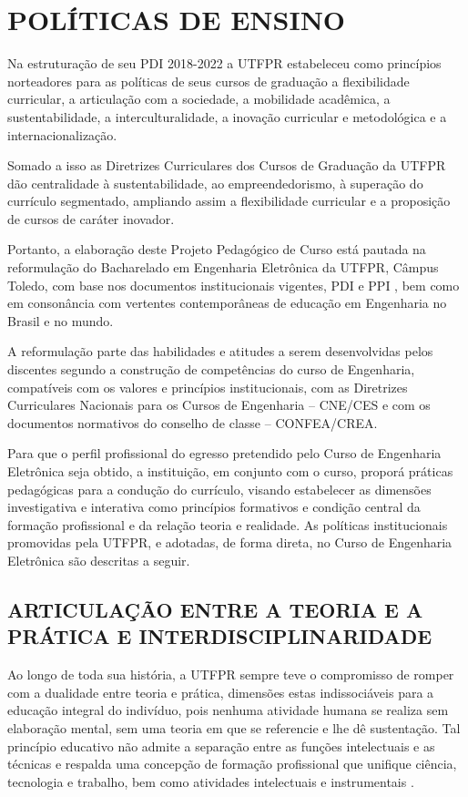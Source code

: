 \chapter{POLÍTICAS DE ENSINO}
\label{chap:politicas}

Na estruturação de seu PDI 2018-2022 \cite{pdiutfpr} a UTFPR estabeleceu como princípios norteadores para as políticas de seus cursos de graduação a flexibilidade curricular, a articulação com a sociedade, a mobilidade acadêmica, a sustentabilidade, a interculturalidade, a inovação curricular e metodológica e a internacionalização.

Somado a isso as Diretrizes Curriculares dos Cursos de Graduação da UTFPR \cite{cogep142} dão centralidade à sustentabilidade, ao empreendedorismo, à superação do currículo segmentado, ampliando assim a flexibilidade curricular e a proposição de cursos de caráter inovador.

Portanto, a elaboração deste Projeto Pedagógico de Curso está pautada na reformulação do Bacharelado em Engenharia Eletrônica da UTFPR, Câmpus Toledo, com base nos documentos institucionais vigentes, PDI \cite{pdiutfpr} e PPI \cite{ppiutfpr}, bem como em consonância com vertentes contemporâneas de educação em Engenharia no Brasil e no mundo.

A reformulação parte das habilidades e atitudes a serem desenvolvidas pelos discentes segundo a construção de competências do curso de Engenharia, compatíveis com os valores e princípios institucionais, com as Diretrizes Curriculares Nacionais para os Cursos de Engenharia – CNE/CES e com os documentos normativos do conselho de classe – CONFEA/CREA.

Para que o perfil profissional do egresso pretendido pelo Curso de Engenharia Eletrônica seja obtido, a instituição, em conjunto com o curso, proporá práticas pedagógicas para a condução do currículo, visando estabelecer as dimensões investigativa e interativa como princípios formativos e condição central da formação profissional e da relação teoria e realidade. As políticas institucionais promovidas pela UTFPR, e adotadas, de forma direta, no Curso de Engenharia Eletrônica são descritas a seguir.

\section{ARTICULAÇÃO ENTRE A TEORIA E A PRÁTICA E INTERDISCIPLINARIDADE}
\label{sec:artc}

Ao longo de toda sua história, a UTFPR sempre teve o compromisso de romper com a dualidade entre teoria e prática, dimensões estas indissociáveis para a educação integral do indivíduo, pois nenhuma atividade humana se realiza sem elaboração mental, sem uma teoria em que se referencie e lhe dê sustentação. Tal princípio educativo não admite a separação entre as funções intelectuais e as técnicas e respalda uma concepção de formação profissional que unifique ciência, tecnologia e trabalho, bem como atividades intelectuais e instrumentais \cite{pdiutfpr}.

